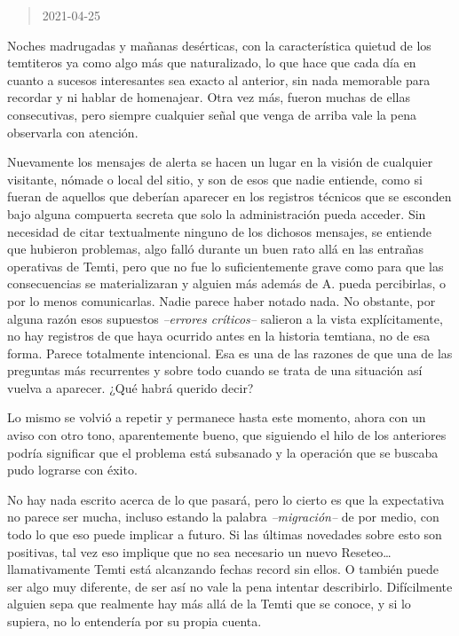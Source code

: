 \documentclass[
  spanish,
]{book}
\begin{document}
\begin{quote}
2021-04-25
\end{quote}

Noches madrugadas y mañanas desérticas, con la característica quietud de los temtiteros ya como algo más que naturalizado, lo que hace que cada día en cuanto a sucesos interesantes sea exacto al anterior, sin nada memorable para recordar y ni hablar de homenajear. Otra vez más, fueron muchas de ellas consecutivas, pero siempre cualquier señal que venga de arriba vale la pena observarla con atención.

Nuevamente los mensajes de alerta se hacen un lugar en la visión de cualquier visitante, nómade o local del sitio, y son de esos que nadie entiende, como si fueran de aquellos que deberían aparecer en los registros técnicos que se esconden bajo alguna compuerta secreta que solo la administración pueda acceder.
Sin necesidad de citar textualmente ninguno de los dichosos mensajes, se entiende que hubieron problemas, algo falló durante un buen rato allá en las entrañas operativas de Temti, pero que no fue lo suficientemente grave como para que las consecuencias se materializaran y alguien más además de A. pueda percibirlas, o por lo menos comunicarlas. Nadie parece haber notado nada.
No obstante, por alguna razón esos supuestos \emph{--errores críticos--} salieron a la vista explícitamente, no hay registros de que haya ocurrido antes en la historia temtiana, no de esa forma. Parece totalmente intencional. Esa es una de las razones de que una de las preguntas más recurrentes y sobre todo cuando se trata de una situación así vuelva a aparecer. ¿Qué habrá querido decir?

Lo mismo se volvió a repetir y permanece hasta este momento, ahora con un aviso con otro tono, aparentemente bueno, que siguiendo el hilo de los anteriores podría significar que el problema está subsanado y la operación que se buscaba pudo lograrse con éxito.

No hay nada escrito acerca de lo que pasará, pero lo cierto es que la expectativa no parece ser mucha, incluso estando la palabra \emph{--migración--} de por medio, con todo lo que eso puede implicar a futuro. Si las últimas novedades sobre esto son positivas, tal vez eso implique que no sea necesario un nuevo Reseteo\ldots{} llamativamente Temti está alcanzando fechas record sin ellos.
O también puede ser algo muy diferente, de ser así no vale la pena intentar describirlo. Difícilmente alguien sepa que realmente hay más allá de la Temti que se conoce, y si lo supiera, no lo entendería por su propia cuenta.
\end{document}
